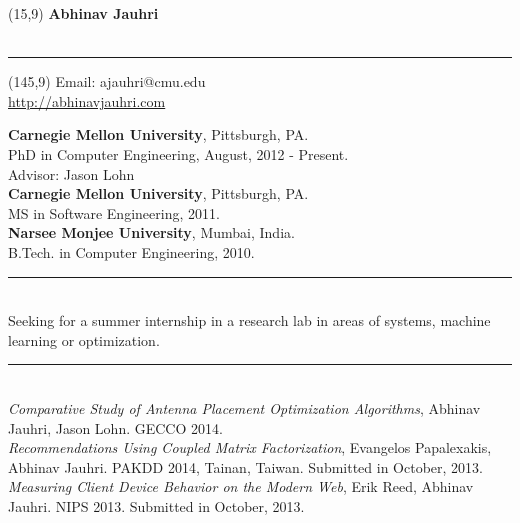 \documentclass[a4paper,oneside,english]{article}
\begin{document}

\begin{textblock}{50}(15,9)
	\noindent \textbf{\huge Abhinav Jauhri}  \\ \\
        \rule{7in}{0.4pt}
\end{textblock}

\begin{textblock}{50}(145,9)
	\noindent Email: ajauhri@cmu.edu  \\
	\noindent \url{http://abhinavjauhri.com} \\
\end{textblock}

\reversemarginpar
{} 
\noindent \textbf{Carnegie Mellon University}, Pittsburgh, PA.  \\ PhD in Computer Engineering, August, 2012 - Present. \\ Advisor: Jason Lohn  \vspace*{2mm} \\
\textbf{Carnegie Mellon University}, Pittsburgh, PA. \\ MS in Software Engineering, 2011. \vspace*{2mm} \\
\textbf{Narsee Monjee University}, Mumbai, India. \\ B.Tech. in Computer Engineering, 2010. \\
\noindent\rule{6in}{0.4pt}  \\[4pt]
\noindent Seeking for a summer internship in a research lab in areas of systems, machine learning or optimization. \\
\noindent\rule{6in}{0.4pt} \\[4pt]
\textit{Comparative Study of Antenna Placement Optimization Algorithms}, Abhinav Jauhri, Jason Lohn. GECCO 2014. \vspace*{2mm} \\
\textit{Recommendations Using Coupled Matrix Factorization}, Evangelos Papalexakis, Abhinav Jauhri. PAKDD 2014, Tainan, Taiwan. Submitted in October, 2013. \vspace*{2mm} \\
\textit{Measuring Client Device Behavior on the Modern Web}, Erik Reed, Abhinav Jauhri. NIPS 2013. Submitted in October, 2013. \\
\end{document}
